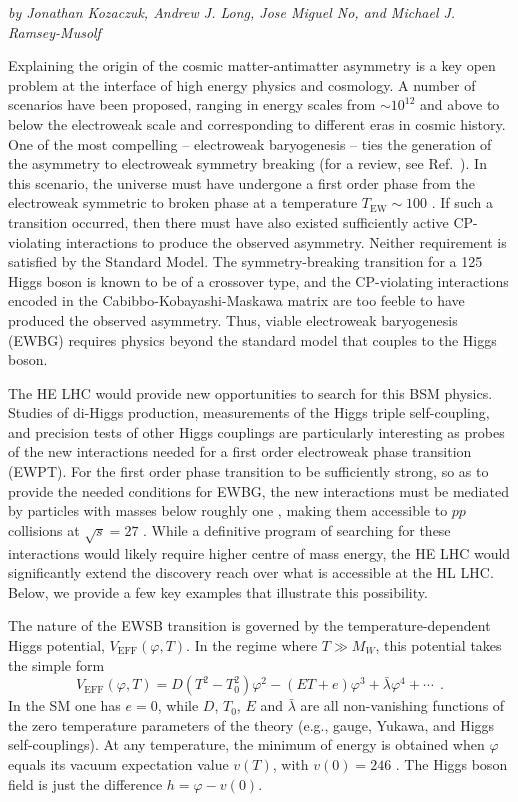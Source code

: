 \begin{center}
\textit{by Jonathan Kozaczuk, Andrew J. Long, Jose Miguel No, and Michael J. Ramsey-Musolf}
\end{center}

 Explaining the origin of the cosmic matter-antimatter asymmetry is a key open problem at the interface of high energy physics and cosmology. A number of scenarios have been proposed, ranging in energy scales from $\sim 10^{12}$ and above to below the electroweak scale and corresponding to different eras in cosmic history. One of the most compelling -- electroweak baryogenesis --  ties the generation of the asymmetry to electroweak symmetry breaking (for a review, see Ref.~\cite{Morrissey:2012db}). In this scenario, the universe must have undergone a first order phase from the electroweak symmetric to broken phase at a temperature $T_\mathrm{EW} \sim 100$ \UGeV. If such a transition occurred, then there must have also existed sufficiently active CP-violating interactions to produce the observed asymmetry. Neither requirement is satisfied by the Standard Model. The symmetry-breaking transition for a 125 \UGeV Higgs boson is known to be of a crossover type, and the CP-violating interactions encoded in the Cabibbo-Kobayashi-Maskawa matrix are too feeble to have produced the observed asymmetry. Thus, viable electroweak baryogenesis (EWBG) requires physics beyond the standard model that couples to the Higgs boson.

The HE LHC would provide new opportunities to search for this BSM physics. Studies of di-Higgs production, measurements of the Higgs triple self-coupling, and precision tests of other Higgs couplings are particularly interesting as probes of the new interactions needed for a first order electroweak phase transition (EWPT). For the first order phase transition to be sufficiently strong, so as to provide the needed conditions for EWBG, the new interactions must be mediated by particles with masses below roughly one \UTeV, making them accessible to $pp$ collisions at $\sqrt{s} = 27$ \UTeV. While a definitive program of searching for these interactions would likely require higher centre of mass energy, the HE LHC would significantly extend the discovery reach over what is accessible at the HL LHC. Below, we provide a few key examples that illustrate this possibility.

 The nature of the EWSB transition is governed by the temperature-dependent Higgs potential, $V_\mathrm{EFF}(\varphi, T)$. In the regime where $T\gg M_W$, this potential takes the 
simple form
\begin{equation}
V_\mathrm{EFF}(\varphi,T) = D(T^2-T_0^2)\varphi^2 -(ET+e)\varphi^3 + {\bar\lambda}\varphi^4+\cdots ~~.
\label{eq:HiggspotT}
\end{equation}
In the SM one has $e=0$, while $D$, $T_0$, $E$ and ${\bar\lambda}$ are all non-vanishing functions of the zero temperature parameters of the theory (e.g., gauge, Yukawa, and Higgs self-couplings). At any temperature, the minimum of energy is obtained when $\varphi$ equals its vacuum expectation value $v(T)$, with $v(0) = 246$ \UGeV. The Higgs boson field is just the difference $h=\varphi-v(0)$. 


